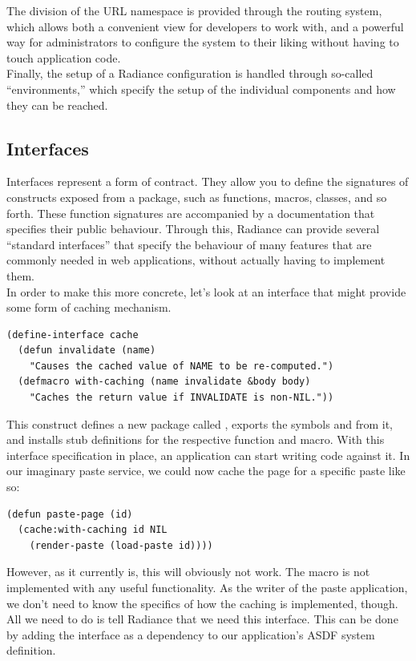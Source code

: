 \documentclass{sig-alternate}
\begin{document}
The division of the URL namespace is provided through the routing system, which allows both a convenient view for developers to work with, and a powerful way for administrators to configure the system to their liking without having to touch application code. \\

Finally, the setup of a Radiance configuration is handled through so-called ``environments,'' which specify the setup of the individual components and how they can be reached.

\subsection{Interfaces}
Interfaces represent a form of contract. They allow you to define the signatures of constructs exposed from a package, such as functions, macros, classes, and so forth. These function signatures are accompanied by a documentation that specifies their public behaviour. Through this, Radiance can provide several ``standard interfaces'' that specify the behaviour of many features that are commonly needed in web applications, without actually having to implement them. \\

In order to make this more concrete, let's look at an interface that might provide some form of caching mechanism.

\begin{verbatim}
(define-interface cache
  (defun invalidate (name)
    "Causes the cached value of NAME to be re-computed.")
  (defmacro with-caching (name invalidate &body body)
    "Caches the return value if INVALIDATE is non-NIL."))
\end{verbatim}

This construct defines a new package called , exports the symbols  and  from it, and installs stub definitions for the respective function and macro. With this interface specification in place, an application can start writing code against it. In our imaginary paste service, we could now cache the page for a specific paste like so:

\begin{verbatim}
(defun paste-page (id)
  (cache:with-caching id NIL
    (render-paste (load-paste id))))
\end{verbatim}

However, as it currently is, this will obviously not work. The  macro is not implemented with any useful functionality. As the writer of the paste application, we don't need to know the specifics of how the caching is implemented, though. All we need to do is tell Radiance that we need this interface. This can be done by adding the interface as a dependency to our application's ASDF\cite{asdf} system definition.
\end{document}
